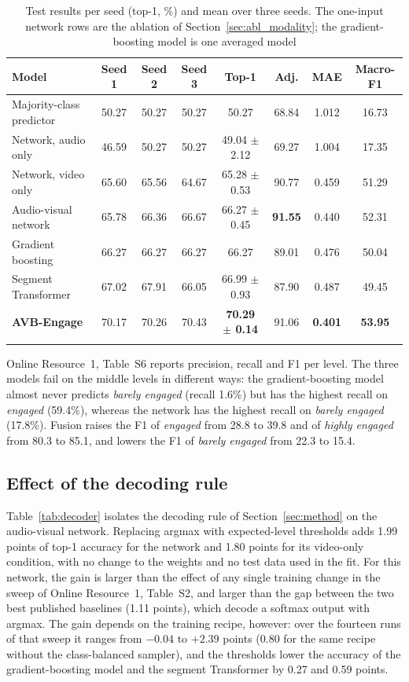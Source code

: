 \documentclass[pdflatex,iicol,sn-basic]{sn-jnl}
\newcommand{\ournet}{AVB-Engage}
\begin{document}
\begin{table}[t]
\tablebodyfont
\caption{Test results per seed (top-1, \%) and mean over three seeds. The one-input network rows are the ablation of Section~\ref{sec:abl_modality}; the gradient-boosting model is one averaged model}\label{tab:seeds}
\begin{tabular*}{\textwidth}{@{\extracolsep\fill}lccccccc}
\toprule
Model & Seed 1 & Seed 2 & Seed 3 & Top-1 & Adj. & MAE & Macro-F1\\
\midrule
Majority-class predictor & 50.27 & 50.27 & 50.27 & 50.27 & 68.84 & 1.012 & 16.73\\
Network, audio only & 46.59 & 50.27 & 50.27 & 49.04 $\pm$ 2.12 & 69.27 & 1.004 & 17.35\\
Network, video only & 65.60 & 65.56 & 64.67 & 65.28 $\pm$ 0.53 & 90.77 & 0.459 & 51.29\\
Audio-visual network & 65.78 & 66.36 & 66.67 & 66.27 $\pm$ 0.45 & \textbf{91.55} & 0.440 & 52.31\\
Gradient boosting & 66.27 & 66.27 & 66.27 & 66.27 & 89.01 & 0.476 & 50.04\\
Segment Transformer & 67.02 & 67.91 & 66.05 & 66.99 $\pm$ 0.93 & 87.90 & 0.487 & 49.45\\
\textbf{\ournet} & 70.17 & 70.26 & 70.43 & \textbf{70.29 $\pm$ 0.14} & 91.06 & \textbf{0.401} & \textbf{53.95}\\
\botrule
\end{tabular*}
\end{table}

Online Resource~1, Table~S6 reports precision, recall and F1 per level. The three models fail on the middle levels in different ways: the gradient-boosting model almost never predicts \emph{barely engaged} (recall 1.6\%) but has the highest recall on \emph{engaged} (59.4\%), whereas the network has the highest recall on \emph{barely engaged} (17.8\%). Fusion raises the F1 of \emph{engaged} from 28.8 to 39.8 and of \emph{highly engaged} from 80.3 to 85.1, and lowers the F1 of \emph{barely engaged} from 22.3 to 15.4.


\subsection{Effect of the decoding rule}\label{sec:res_decoder}

Table~\ref{tab:decoder} isolates the decoding rule of Section~\ref{sec:method} on the audio-visual network. Replacing argmax with expected-level thresholds adds 1.99 points of top-1 accuracy for the network and 1.80 points for its video-only condition, with no change to the weights and no test data used in the fit. For this network, the gain is larger than the effect of any single training change in the sweep of Online Resource~1, Table~S2, and larger than the gap between the two best published baselines (1.11 points), which decode a softmax output with argmax. The gain depends on the training recipe, however: over the fourteen runs of that sweep it ranges from $-0.04$ to $+2.39$ points (0.80 for the same recipe without the class-balanced sampler), and the thresholds lower the accuracy of the gradient-boosting model and the segment Transformer by 0.27 and 0.59 points.
\end{document}
